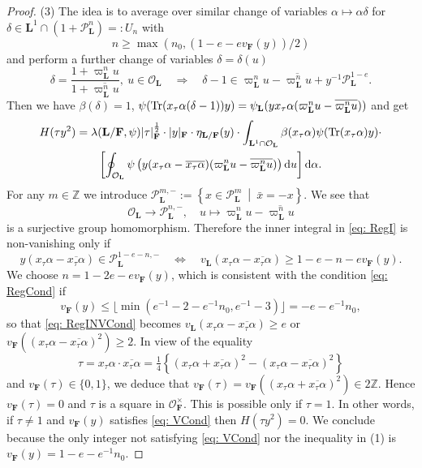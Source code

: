 \documentclass[A4]{amsart}
\def\leq{\leqslant}
\def\geq{\geqslant}
\numberwithin{equation}{section} \everymath{\displaystyle}
\newcommand{\Tr}{{\rm Tr}}
\newcommand{\Z}{\mathbb{Z}}
\newcommand{\ud}{\mathrm{d}}
\newcommand{\F}{\mathbf{F}}
\newcommand{\bL}{\mathbf{L}}
\newcommand{\vO}{\mathcal{O}}
\newcommand{\vP}{\mathcal{P}}
\newcommand{\norm}[1][\cdot]{\lvert #1 \rvert}
\begin{document}
\begin{proof}
\noindent (3) The idea is to average over similar change of variables $\alpha \mapsto \alpha \delta$ for $\delta \in \bL^1 \cap (1+\vP_{\bL}^{n}) =: U_n$ with
\begin{equation} \label{eq: RegCond}
	n \geq \max(n_0, (1-e-ev_{\F}(y))/2)
\end{equation} 
	and perform a further change of variables $\delta = \delta(u)$
	$$ \delta = \frac{1+\varpi_{\bL}^n u}{1+\overline{\varpi_{\bL}^n u}}, \ u \in \vO_{\bL} \quad \Rightarrow \quad \delta - 1 \in \varpi_{\bL}^n u - \overline{\varpi_{\bL}^n u} + y^{-1}\vP_{\bL}^{1-e}. $$
	Then we have $\beta(\delta)=1$, $\psi(\Tr(x_{\tau} \alpha(\delta-1)) y) = \psi_{\bL}(y x_{\tau} \alpha (\varpi_{\bL}^n u - \overline{\varpi_{\bL}^n u}))$ and get
\begin{multline} \label{eq: RegI}
	H(\tau y^2) = \lambda(\bL/\F,\psi) \norm[\tau]_{\F}^{\frac{1}{2}} \cdot \norm[y]_{\F} \cdot \eta_{\bL/\F}(y) \cdot \int_{\bL^1 \cap \vO_{\bL}} \beta(x_{\tau} \alpha) \psi(\Tr(x_{\tau} \alpha) y) \cdot \\
	\left[ \oint_{\vO_{\bL}} \psi \left( y (x_{\tau} \alpha - \overline{x_{\tau} \alpha}) (\varpi_{\bL}^n u - \overline{\varpi_{\bL}^n u}) \right) \ud u \right] \ud \alpha.
\end{multline}
	For any $m \in \Z$ we introduce $\vP_{\bL}^{m,-} := \left\{ x \in \vP_{\bL}^m \ \middle| \ \bar{x} = -x \right\}$. We see that
	$$ \vO_{\bL} \to \vP_{\bL}^{n,-}, \quad u \mapsto \varpi_{\bL}^n u - \overline{\varpi_{\bL}^n u} $$
	is a surjective group homomorphism. Therefore the inner integral in \eqref{eq: RegI} is non-vanishing only if
\begin{equation} \label{eq: RegINVCond} 
	y (x_{\tau} \alpha - \overline{x_{\tau} \alpha}) \in \vP_{\bL}^{1-e-n,-} \quad \Leftrightarrow \quad v_{\bL}(x_{\tau} \alpha - \overline{x_{\tau} \alpha}) \geq 1-e-n-ev_{\F}(y). 
\end{equation}
	We choose $n = 1-2e-ev_{\F}(y)$, which is consistent with the condition \eqref{eq: RegCond} if 
\begin{equation} \label{eq: VCond}
	v_{\F}(y) \leq \lfloor \min(e^{-1}-2-e^{-1}n_0, e^{-1}-3) \rfloor = -e-e^{-1}n_0, 
\end{equation}
	so that \eqref{eq: RegINVCond} becomes $v_{\bL}(x_{\tau} \alpha - \overline{x_{\tau} \alpha}) \geq e$ or $v_{\F}((x_{\tau} \alpha - \overline{x_{\tau} \alpha})^2) \geq 2$. In view of the equality
\begin{equation} \label{eq: TauDecomp}
	\tau = x_{\tau} \alpha \cdot \overline{x_{\tau} \alpha} = \tfrac{1}{4} \left\{ (x_{\tau} \alpha + \overline{x_{\tau} \alpha})^2 - (x_{\tau} \alpha - \overline{x_{\tau} \alpha})^2 \right\} 
\end{equation}
	and $v_{\F}(\tau) \in \{0,1\}$, we deduce that $v_{\F}(\tau) = v_{\F}((x_{\tau} \alpha + \overline{x_{\tau} \alpha})^2) \in 2\Z$. Hence $v_{\F}(\tau)=0$ and $\tau$ is a square in $\vO_{\F}^{\times}$. This is possible only if $\tau=1$. In other words, if $\tau \neq 1$ and $v_{\F}(y)$ satisfies \eqref{eq: VCond} then $H(\tau y^2) = 0$. We conclude because the only integer not satisfying \eqref{eq: VCond} nor the inequality in (1) is $v_{\F}(y) = 1-e-e^{-1}n_0$.
	

\end{proof}
\end{document}
